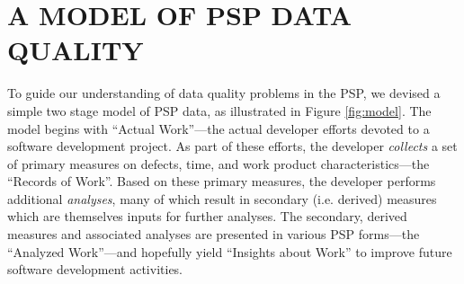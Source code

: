 
\section{A MODEL OF PSP DATA QUALITY}

\begin{figure*}
    {\centerline{}}
    \caption{\label{fig:model} A simple model for PSP data quality. Through 
      a process of {\em collection}, the developer generates an initial
      empirical representation (``Records of Work'') of her personal process
      (``Actual Work'').  Through additional {\em analyses}, the developer
      augments her initial empirical representation with
      derived data (``Analyzed Work'') intended to enable process improvement
      through ``Insights about Work''.
      }
\end{figure*}
     
To guide our understanding of data quality problems in the PSP, we devised
a simple two stage model of PSP data, as illustrated in Figure
\ref{fig:model}.  The model begins with ``Actual Work''---the actual developer
efforts devoted to a software development project.  As part of these
efforts, the developer {\em collects} a set of primary measures on defects,
time, and work product characteristics---the ``Records of Work''. Based on
these primary measures, the developer performs additional {\em analyses},
many of which result in secondary (i.e.  derived) measures which are
themselves inputs for further analyses.  The secondary, derived measures
and associated analyses are presented in various PSP forms---the ``Analyzed
Work''---and hopefully yield ``Insights about Work'' to improve future
software development activities.

